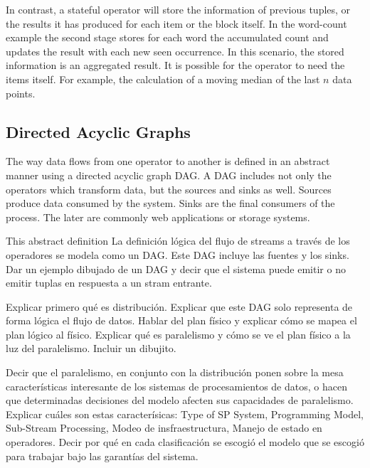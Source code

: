   In contrast, a stateful operator will store the information of previous
  tuples, or the results it has produced for each item or the block itself. In
  the word-count example the second stage stores for each word the accumulated
  count and updates the result with each new seen occurrence. In this scenario,
  the stored information is an aggregated result. It is possible for the
  operator to need the items itself. For example, the calculation of a moving
  median of the last $n$ data points.

  \subsection{Directed Acyclic Graphs}
  The way data flows from one operator to another is defined in an abstract manner using a directed acyclic graph DAG. A DAG includes not only the operators which transform data, but the sources and sinks as well. Sources produce data consumed by the system. Sinks are the final consumers of the process. The later are commonly web applications or storage systems.


  This abstract definition
  La definición lógica del flujo de streams a través de los operadores se
  modela como un DAG. Este DAG incluye las fuentes y los sinks. Dar un ejemplo
  dibujado de un DAG y decir que el sistema puede emitir o no emitir tuplas en
  respuesta a un stram entrante.

  Explicar primero qué es distribución. Explicar que este DAG solo representa
  de forma lógica el flujo de datos. Hablar del plan físico y explicar cómo se
  mapea el plan lógico al físico. Explicar qué es paralelismo y cómo se ve el
  plan físico a la luz del paralelismo. Incluir un dibujito.
  \cite{kamburugamuve2013survey}

  Decir que el paralelismo, en conjunto con la distribución ponen sobre la mesa
  características interesante de los sistemas de procesamientos de datos, o
  hacen que determinadas decisiones del modelo afecten sus capacidades de
  paralelismo. Explicar cuáles son estas caracterísicas: Type of SP System,
  Programming Model, Sub-Stream Processing, Modeo de insfraestructura, Manejo
  de estado en operadores. \cite{R_ger_2019} Decir por qué en cada
  clasificación se escogió el modelo que se escogió para trabajar bajo las
  garantías del sistema.

